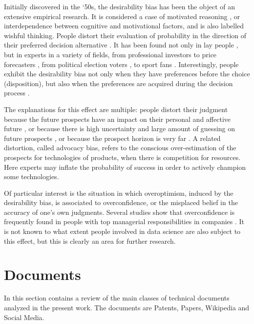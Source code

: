 \documentclass[]{book}
\theoremstyle{definition}
\theoremstyle{definition}
\theoremstyle{definition}
\theoremstyle{remark}
\begin{document}
Initially discovered in the `50s, the desirability bias has been the
object of an extensive empirical research. It is considered a case of
motivated reasoning \citep{kunda1990case}, or interdependence between
cognitive and motivational factors, and is also labelled wishful
thinking. People distort their evaluation of probability in the
direction of their preferred decision alternative
\citep{dekay2009distortion}. It has been found not only in lay people
\citep{lench2012automatic}, but in experts in a variety of fields, from
professional investors to price forecasters , from political election
voters , to sport fans . Interestingly, people exhibit the desirability
bias not only when they have preferences before the choice
(disposition), but also when the preferences are acquired during the
decision process \citep{russo1996distortion}.

The explanations for this effect are multiple: people distort their
judgment because the future prospects have an impact on their personal
and affective future
\citep{ayton1989psychological, wright1996role, lench2008automatic}, or
because there is high uncertainty and large amount of guessing on future
prospects \citep{windschitl2010desirability}, or because the prospect
horizon is very far \citep{vosgerau2010prevalent}. A related distortion,
called advocacy bias, refers to the conscious over-estimation of the
prospects for technologies of products, when there is competition for
resources. Here experts may inflate the probability of success in order
to actively champion some technologies.

Of particular interest is the situation in which overoptimism, induced
by the desirability bias, is associated to overconfidence, or the
misplaced belief in the accuracy of one's own judgments. Several studies
show that overconfidence is frequently found in people with top
managerial responsibilities in companies \citep{hribar2016ceo}. It is
not known to what extent people involved in data science are also
subject to this effect, but this is clearly an area for further
research.

\chapter{Documents}\label{sotadocuments}

In this section contains a review of the main classes of technical
documents analyzed in the present work. The documents are Patents,
Papers, Wikipedia and Social Media.
\end{document}
